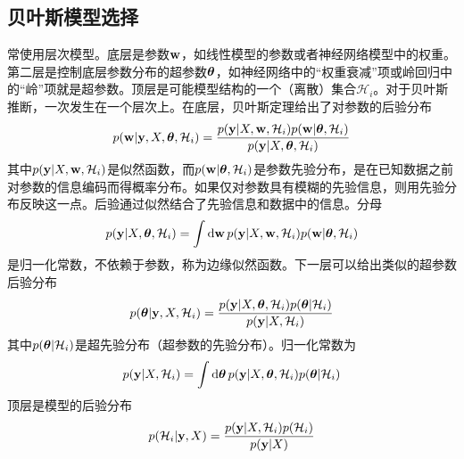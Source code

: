 \documentclass[12pt,UTF8]{article}
\begin{document}
        \subsection{贝叶斯模型选择}
            常使用层次模型。底层是参数$\vb{w}$，如线性模型的参数或者神经网络模型中的权重。第二层是控制底层参数分布的超参数$\vb*{\theta}$，如神经网络中的“权重衰减”项或岭回归中的“岭”项就是超参数。顶层是可能模型结构的一个（离散）集合$\mathcal{H}_i$。对于贝叶斯推断，一次发生在一个层次上。在底层，贝叶斯定理给出了对参数的后验分布
            \begin{equation}
                p(\vb{w}|\vb{y},X,\vb*{\theta},\mathcal{H}_i)=\frac{p(\vb{y}|X,\vb{w},\mathcal{H}_i)p(\vb{w}|\vb*{\theta},\mathcal{H}_i)}{p(\vb{y}|X,\vb*{\theta},\mathcal{H}_i)}
            \end{equation}
            其中$p(\vb{y}|X,\vb{w},\mathcal{H}_i)$是似然函数，而$p(\vb{w}|\vb*{\theta},\mathcal{H}_i)$是参数先验分布，是在已知数据之前对参数的信息编码而得概率分布。如果仅对参数具有模糊的先验信息，则用先验分布反映这一点。后验通过似然结合了先验信息和数据中的信息。分母
            \begin{equation}
                p(\vb{y}|X,\vb*{\theta},\mathcal{H}_i)=\int{\dd{\vb{w}}p(\vb{y}|X,\vb{w},\mathcal{H}_i)p(\vb{w}|\vb*{\theta},\mathcal{H}_i)}
            \end{equation}
            是归一化常数，不依赖于参数，称为边缘似然函数。下一层可以给出类似的超参数后验分布
            \begin{equation}
                p(\vb*{\theta}|\vb{y},X,\mathcal{H}_i)=\frac{p(\vb{y}|X,\vb*{\theta},\mathcal{H}_i)p(\vb*{\theta}|\mathcal{H}_i)}{p(\vb{y}|X,\mathcal{H}_i)}
            \end{equation}
            其中$p(\vb*{\theta}|\mathcal{H}_i)$是超先验分布（超参数的先验分布）。归一化常数为
            \begin{equation}
                p(\vb{y}|X,\mathcal{H}_i)=\int{\dd{\vb*{\theta}}p(\vb{y}|X,\vb*{\theta},\mathcal{H}_i)p(\vb*{\theta}|\mathcal{H}_i)}
            \end{equation}
            顶层是模型的后验分布
            \begin{equation}
                p(\mathcal{H}_i|\vb{y},X)=\frac{p(\vb{y}|X,\mathcal{H}_i)p(\mathcal{H}_i)}{p(\vb{y}|X)}
            \end{equation}
\end{document}
